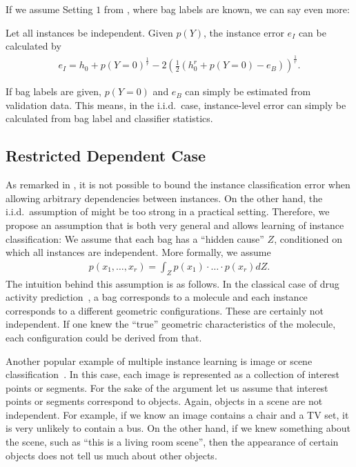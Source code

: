 If we assume Setting $1$ from , where bag labels are known, we can say even more:
\begin{theorem}\label{equality}
Let all instances be independent. Given $p(Y)$, the instance error $e_I$ can be calculated by
\begin{align}
e_I = h_0 + p(Y=0)^\frac{1}{r} - 2 \left (\frac{1}{2} ( h_0^r + p(Y=0) - e_B) \right)^\frac{1}{r}.
\end{align}
\end{theorem}
If bag labels are given, $p(Y=0)$ and $ e_B$ can simply be estimated from validation data.
This means, in the i.i.d.\ case, instance-level error can simply be calculated from bag label and classifier statistics.

\subsection{Restricted Dependent Case}
As remarked in , it is not possible to bound the instance classification error
when allowing arbitrary dependencies between instances. On the other hand, the i.i.d.\ assumption of 
might be too strong in a practical setting.
Therefore, we propose an assumption that is both very general and allows learning of instance classification:
We assume that each bag has a ``hidden cause'' $Z$, conditioned on which all instances are independent.
More formally, we assume
\begin{align}
    p(x_1,\dotsc,x_r)=\int_Z p(x_1)\cdot \dotsc \cdot p(x_r) dZ.
\end{align}
The intuition behind this assumption is as follows. In the classical case of drug activity prediction~\citep{dietterich1997solving}, a bag corresponds
to a molecule and each instance corresponds to a different geometric configurations. These are certainly not independent.
If one knew the ``true'' geometric characteristics of the molecule, each configuration could be derived from that.

Another popular example of multiple instance learning is image or scene classification~\citep{zhou2007multi,zha2008joint,zhou2009multi}.
In this case, each image
is represented as a collection of interest points or segments.
For the sake of the argument let us assume that interest points or segments correspond to objects.
Again, objects in a scene are not independent. For example, if we know an image contains a chair and a TV set,
it is very unlikely to contain a bus.
On the other hand, if we knew something about the scene, such as ``this is a living room scene'', then the appearance
of certain objects does not tell us much about other objects.

